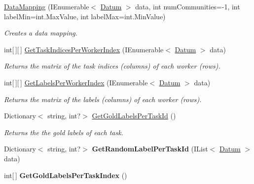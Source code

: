 \begin{DoxyCompactItemize}
\item 
\hyperlink{class_crowdsourcing_models_1_1_data_mapping_aeb425a824cc4074db2857ac8ba6c1a69}{Data\+Mapping} (I\+Enumerable$<$ \hyperlink{class_crowdsourcing_models_1_1_datum}{Datum} $>$ data, int num\+Communities=-\/1, int label\+Min=int.\+Max\+Value, int label\+Max=int.\+Min\+Value)
\begin{DoxyCompactList}\small\item\em Creates a data mapping. \end{DoxyCompactList}\item 
int\mbox{[}$\,$\mbox{]}\mbox{[}$\,$\mbox{]} \hyperlink{class_crowdsourcing_models_1_1_data_mapping_a1d48c08325772a613b78f4a8a52c57e9}{Get\+Task\+Indices\+Per\+Worker\+Index} (I\+Enumerable$<$ \hyperlink{class_crowdsourcing_models_1_1_datum}{Datum} $>$ data)
\begin{DoxyCompactList}\small\item\em Returns the matrix of the task indices (columns) of each worker (rows). \end{DoxyCompactList}\item 
int\mbox{[}$\,$\mbox{]}\mbox{[}$\,$\mbox{]} \hyperlink{class_crowdsourcing_models_1_1_data_mapping_ad7a6b996ec247265bc7902b9e48d0c3d}{Get\+Labels\+Per\+Worker\+Index} (I\+Enumerable$<$ \hyperlink{class_crowdsourcing_models_1_1_datum}{Datum} $>$ data)
\begin{DoxyCompactList}\small\item\em Returns the matrix of the labels (columns) of each worker (rows). \end{DoxyCompactList}\item 
Dictionary$<$ string, int?$>$ \hyperlink{class_crowdsourcing_models_1_1_data_mapping_ad542e9c734bb68b141e7cb24f9236196}{Get\+Gold\+Labels\+Per\+Task\+Id} ()
\begin{DoxyCompactList}\small\item\em Returns the the gold labels of each task. \end{DoxyCompactList}\item 
\hypertarget{class_crowdsourcing_models_1_1_data_mapping_af69c3292c1b9522772007cc8433b1330}{}Dictionary$<$ string, int?$>$ {\bfseries Get\+Random\+Label\+Per\+Task\+Id} (I\+List$<$ \hyperlink{class_crowdsourcing_models_1_1_datum}{Datum} $>$ data)\label{class_crowdsourcing_models_1_1_data_mapping_af69c3292c1b9522772007cc8433b1330}

\item 
\hypertarget{class_crowdsourcing_models_1_1_data_mapping_ae52e28d46739ddf659e671b189a9d6a9}{}int\mbox{[}$\,$\mbox{]} {\bfseries Get\+Gold\+Labels\+Per\+Task\+Index} ()\label{class_crowdsourcing_models_1_1_data_mapping_ae52e28d46739ddf659e671b189a9d6a9}


\end{DoxyCompactItemize}
